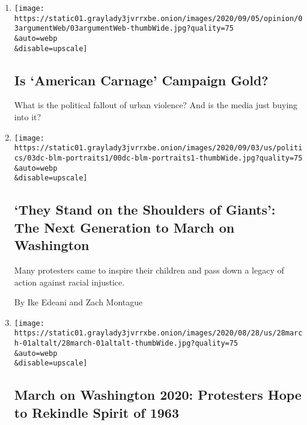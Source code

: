 \begin{enumerate}
\def\labelenumi{\arabic{enumi}.}
\item
  \href{/2020/09/03/opinion/the-argument-trump-biden-kenosha-portland.html}{}

  \texttt{[image: https://static01.graylady3jvrrxbe.onion/images/2020/09/05/opinion/03argumentWeb/03argumentWeb-thumbWide.jpg?quality=75\\\&auto=webp\\\&disable=upscale]}

  \hypertarget{is-american-carnage-campaign-gold}{%
  \subsection{Is `American Carnage' Campaign
  Gold?}\label{is-american-carnage-campaign-gold}}

  What is the political fallout of urban violence? And is the media just
  buying into it?
\item
  \href{/2020/09/02/us/politics/blm-march-on-washington.html}{}

  \texttt{[image: https://static01.graylady3jvrrxbe.onion/images/2020/09/03/us/politics/03dc-blm-portraits1/00dc-blm-portraits1-thumbWide.jpg?quality=75\\\&auto=webp\\\&disable=upscale]}

  \hypertarget{they-stand-on-the-shoulders-of-giants-the-next-generation-to-march-on-washington}{%
  \subsection{`They Stand on the Shoulders of Giants': The Next
  Generation to March on
  Washington}\label{they-stand-on-the-shoulders-of-giants-the-next-generation-to-march-on-washington}}

  Many protesters came to inspire their children and pass down a legacy
  of action against racial injustice.

  By Ike Edeani and Zach Montague
\item
  \href{/2020/08/28/us/march-on-washington-2020.html}{}

  \texttt{[image: https://static01.graylady3jvrrxbe.onion/images/2020/08/28/us/28march-01altalt/28march-01altalt-thumbWide.jpg?quality=75\\\&auto=webp\\\&disable=upscale]}

  \hypertarget{march-on-washington-2020-protesters-hope-to-rekindle-spirit-of-1963}{%
  \subsection{March on Washington 2020: Protesters Hope to Rekindle
  Spirit of
  1963}\label{march-on-washington-2020-protesters-hope-to-rekindle-spirit-of-1963}}


\end{enumerate}
